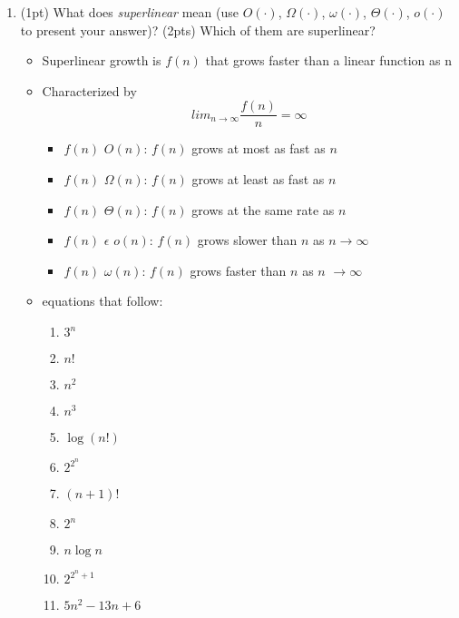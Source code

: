 \documentclass{article}[12pt]
\newcommand\encircle[1]{\raisebox{.5pt}{\textcircled{\raisebox{-.9pt} {\footnotesize #1}}} }
\begin{document}
\begin{enumerate}[label=(\arabic*)]
  \item (1pt) What does \emph{superlinear} mean (use $O(\cdot)$, $\Omega(\cdot)$, $\omega(\cdot)$, $\Theta(\cdot)$, $o(\cdot)$ to present your answer)? (2pts) Which of them are superlinear?
    \begin{itemize}
      \item Superlinear growth is $f(n)$ that grows faster than a linear function as n \rightarrow \infty
      \item Characterized by
        \begin{equation}
          lim_{n \rightarrow \infty} \frac{f(n)}{n} = \infty
        \end{equation}
        \begin{itemize}
          \item $f(n)$ \epsilon $O(n)$: $f(n)$ grows at most as fast as $n$
          \item $f(n)$ \epsilon $\Omega(n)$: $f(n)$ grows at least as fast as $n$
          \item $f(n)$ \epsilon $\Theta(n)$: $f(n)$ grows at the same rate as $n$
          \item $f(n)$ $\epsilon$  $o(n)$: $f(n)$ grows slower than $n$ as $n \rightarrow \infty$
          \item $f(n)$ \epsilon $\omega(n)$: $f(n)$ grows faster than $n$ as $n$ $\rightarrow \infty$
        \end{itemize}
      \item equations that follow:
\begin{center}
\begin{multicols}{4}
\begin{enumerate}[label=\encircle{\arabic*}]
  \item $3^n$
  \item $n!$
  \item $n^2$
  \item $n^3$
  \item $\log(n!)$
  \item $2^{2^n}$
  \item $(n+1)!$
  \item $2^n$
  \item $n\log n$
  \item $2^{2^n+1}$
  \item $5n^2-13n+6$
\end{enumerate}
\end{multicols}
\end{center}
    \end{itemize}


\end{enumerate}
\end{document}
